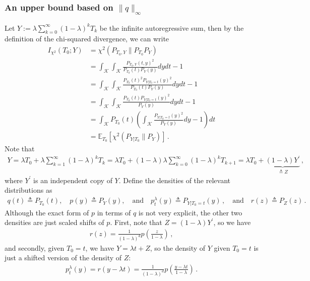 \documentclass{article}
\theoremstyle{plain}
\theoremstyle{definition}
\theoremstyle{plain}
\newcommand{\E}{\mathbb E}
\newcommand{\cK}{\mathcal K}
\begin{document}
\clearpage

\subsubsection{An upper bound based on $\|q\|_{\infty}$}
Let $Y := \lambda \sum_{k=0}^\infty (1-\lambda)^k T_k$ be the infinite autoregressive sum,
then by the definition of the chi-squared divergence, we can write
\begin{align}
    I_{\chi^2}(T_0; Y)
     & = \chi^2(P_{T_0, Y} \| P_{T_0} P_{Y})                                                       \\
     & = \int_{\cK} \int_{\cK} \frac{P_{T_0, Y}(t, y)^2}{P_{T_0}(t) P_{Y}(y)} dy dt - 1            \\
     & = \int_{\cK} \int_{\cK} \frac{P_{T_0}(t)^2 P_{Y|T_0=t}(y)^2}{P_{T_0}(t) P_{Y}(y)} dy dt - 1 \\
     & = \int_{\cK} \int_{\cK} \frac{P_{T_0}(t) P_{Y|T_0=t}(y)^2}{P_{Y}(y)} dy dt - 1              \\
     & = \int_{\cK} P_{T_0}(t) \left(\int_{\cK} \frac{P_{Y|T_0=t}(y)^2}{P_{Y}(y)} dy - 1\right) dt \\
     & = \E_{T_0} \left[
        \chi^2(P_{Y|T_0} \| P_{Y})
        \right]\,.
\end{align}
Note that
\begin{align}
    Y = \lambda T_0 + \lambda \sum_{k=1}^\infty (1-\lambda)^k T_k
    = \lambda T_0 + (1-\lambda) \lambda \sum_{k=0}^\infty (1-\lambda)^k T_{k+1}
    = \lambda T_0 + \underbrace{(1-\lambda) Y^\prime}_{\triangleq Z}\,,
\end{align}
where $Y^\prime$ is an independent copy of $Y$.
Define the densities of the relevant distributions as
\begin{align}
    q(t) \triangleq P_{T_0}(t), \quad p(y) \triangleq P_{Y}(y), \quad \text{and} \quad p_t^\lambda(y) \triangleq P_{Y|T_0=t}(y)\,, \quad \text{and} \quad r(z) \triangleq P_Z(z)\,.
\end{align}
Although the exact form of $p$ in terms of $q$ is not very explicit,
the other two densities are just scaled shifts of $p$.
First, note that $Z = (1-\lambda) Y^\prime$, so we have
\begin{align}
    r(z) = \frac{1}{(1-\lambda)^d} p\left(\frac{z}{1-\lambda}\right)\,,
\end{align}
and secondly, given $T_0 = t$, we have $Y = \lambda t + Z$, so the density of $Y$ given $T_0 = t$ is just a shifted version of the density of $Z$:
\begin{align}
    p_t^\lambda(y) = r(y - \lambda t) = \frac{1}{(1-\lambda)^d} p\left(\frac{y - \lambda t}{1-\lambda}\right)\,.
\end{align}
\end{document}
